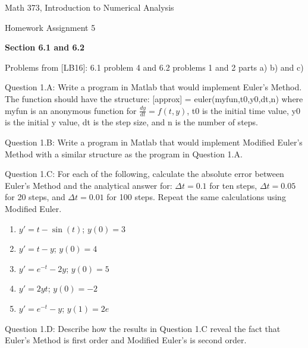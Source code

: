 \documentclass{article}
\renewcommand{\cite}[1]{[#1]}
\def\ds{\displaystyle}
\begin{document}

\large

{\Large Math 373, Introduction to Numerical Analysis}


{\Large Homework Assignment 5} 




{\bf Section 6.1 and 6.2} \par \medskip \noindent
Problems from \cite{LB16}: 6.1 problem 4 and 6.2 problems 1 and 2 parts a) b) and c)   
\par \medskip \noindent
%
Question 1.A: Write a program in Matlab that would implement Euler's Method. The function should have the structure: [approx] = euler(myfun,t0,y0,dt,n) where myfun is an anonymous function for $\ds \frac {dy}{dt}=f(t,y)$, t0 is the initial time value, y0 is the initial y value, dt is the step size, and n is the number of steps.   
\medskip \par \noindent
%
Question 1.B: Write a program in Matlab that would implement Modified Euler's Method with a similar structure as the program in Question 1.A. 
\medskip \par \noindent
%
Question 1.C: For each of the following, calculate the absolute error between Euler's Method and the analytical answer for: $\ds \Delta t =0.1$ for ten steps, $\ds \Delta t =0.05$ for 20 steps, and $\ds \Delta t = 0.01$ for 100 steps. Repeat the same calculations using Modified Euler. 
\par
\begin{enumerate}[label=\alph*)]
    \item $\ds y' =t-\sin(t)$; \hspace{0.3in} $y(0)=3$
    \item $\ds y' =t-y$; \hspace{0.4in}  $y(0)=4$
    \item $\ds y' =e^{-t}-2y$; \hspace{0.2in}  $y(0)=5$
    \item $\ds y' =2yt$; \hspace{0.5in}  $y(0)=-2$
    \item $\ds y' =e^{-t}-y$; \hspace{0.3in}  $y(1)=2e$
\end{enumerate}
\medskip \par \noindent
%
Question 1.D: Describe how the results in Question 1.C reveal the fact that Euler's Method is first order and Modified Euler's is second order. 
\end{document}
